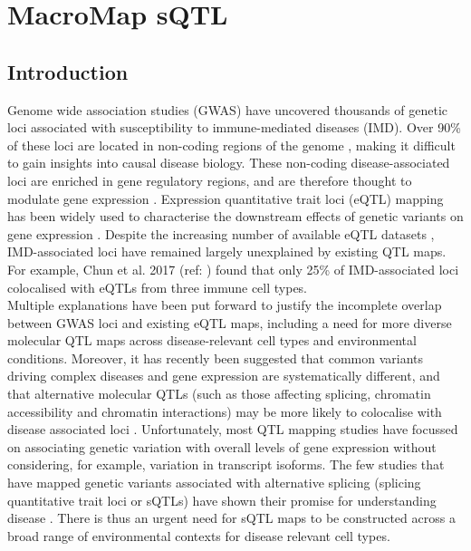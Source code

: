
\chapter{MacroMap sQTL}

\ifpdf
    \graphicspath{{Chapter2/Figs/Raster/}{Chapter2/Figs/PDF/}{Chapter2/Figs/}}
\else
    \graphicspath{{Chapter2/Figs/Vector/}{Chapter2/Figs/}}
\fi
{}
\section{Introduction}
Genome wide association studies (GWAS) have uncovered thousands of genetic loci associated with susceptibility to immune-mediated diseases (IMD). Over 90\% of these loci are located in non-coding regions of the genome \cite{Maurano2012-yw}, making it difficult to gain insights into causal disease biology. These non-coding disease-associated loci are enriched in gene regulatory regions, and are therefore thought to modulate gene expression \cite{Schaub2012-cy}. Expression quantitative trait loci (eQTL) mapping has been widely used to characterise the downstream effects of genetic variants on gene expression \cite{Vosa2021-pb,The_GTEx_Consortium2020-gg}. Despite the increasing number of available eQTL datasets \cite{Kerimov2021-gh}, IMD-associated loci have remained largely unexplained by existing QTL maps. For example, Chun et al. 2017 (ref: \cite{Chun2017-uz}) found that only 25\% of IMD-associated loci colocalised with eQTLs from three immune cell types. \\

Multiple explanations have been put forward to justify the incomplete overlap between GWAS loci and existing eQTL maps, including a need for more diverse molecular QTL maps across disease-relevant cell types and environmental conditions. Moreover, it has recently been suggested that common variants driving complex diseases and gene expression are systematically different, and that alternative molecular QTLs (such as those affecting splicing, chromatin accessibility and chromatin interactions) may be more likely to colocalise with disease associated loci \cite{Mostafavi2022-tg}. Unfortunately, most QTL mapping studies have focussed on associating genetic variation with overall levels of gene expression without considering, for example, variation in transcript isoforms. The few studies that have mapped genetic variants associated with alternative splicing (splicing quantitative trait loci or sQTLs) have shown their promise for understanding disease \cite{Li2016-wu,Kim-Hellmuth2020-gz}. There is thus an urgent need for sQTL maps to be constructed across a broad range of environmental contexts for disease relevant cell types. \\

